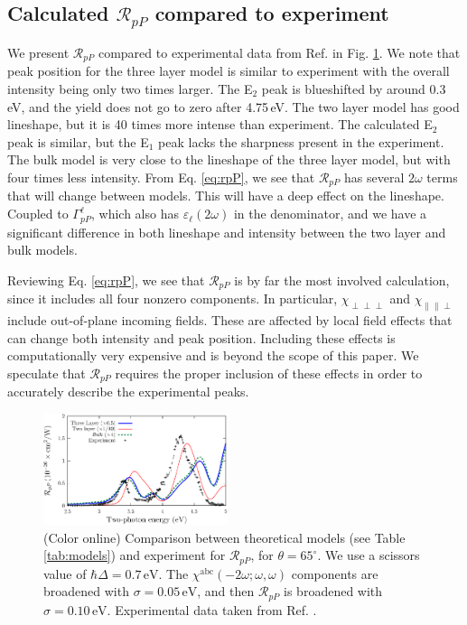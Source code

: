 \subsection{Calculated \texorpdfstring{$\mathcal{R}_{pP}$}{RpP} compared to
experiment}\label{sec:RpP}

We present $\mathcal{R}_{pP}$ compared to experimental data from Ref.
\cite{mejiaPRB02} in Fig. \ref{fig:RpP}. We note that peak position for
the three layer model is similar to experiment with the overall intensity being
only two times larger. The E$_{2}$ peak is blueshifted by around 0.3\,eV, and
the yield does not go to zero after 4.75\,eV. The two layer model has good
lineshape, but it is 40 times more intense than experiment. The calculated
E$_{2}$ peak is similar, but the E$_{1}$ peak lacks the sharpness present in the
experiment. The bulk model is very close to the lineshape of the three layer
model, but with four times less intensity. From Eq. \eqref{eq:rpP}, we see that
$\mathcal{R}_{pP}$ has several $2\omega$ terms that will change between models.
This will have a deep effect on the lineshape. Coupled to $\Gamma^{\ell}_{pP}$,
which also has $\varepsilon_{\ell}(2\omega)$ in the denominator, and we have a
significant difference in both lineshape and intensity between the two layer and
bulk models.

Reviewing Eq. \eqref{eq:rpP}, we see that $\mathcal{R}_{pP}$ is by far the most
involved calculation, since it includes all four nonzero components. In
particular, $\chi_{\perp\perp\perp}$ and $\chi_{\parallel\parallel\perp}$
include out-of-plane incoming fields. These are affected by local field effects
that can change both intensity and peak
position.\cite{tancognedejean:tel-01235611} Including these effects is
computationally very expensive and is beyond the scope of this paper. We
speculate that $\mathcal{R}_{pP}$ requires the proper inclusion of these effects
in order to accurately describe the experimental peaks.

\begin{figure}[b]
\centering
\includegraphics[width=0.48\textwidth]{figures/03-results/shgyield/fig7}
\caption{(Color online) Comparison between theoretical models (see Table
\ref{tab:models}) and experiment for $\mathcal{R}_{pP}$, for
$\theta=65^{\circ}$. We use a scissors value of $\hbar\Delta = 0.7\,\text{eV}$.
The $\chi^{\mathrm{abc}}(-2\omega;\omega,\omega)$ components are broadened with
$\sigma=0.05\,\text{eV}$, and then $\mathcal{R}_{pP}$ is broadened with
$\sigma=0.10\,\text{eV}$. Experimental data taken from Ref.
\cite{mejiaPRB02}.\label{fig:RpP}}
\end{figure}

